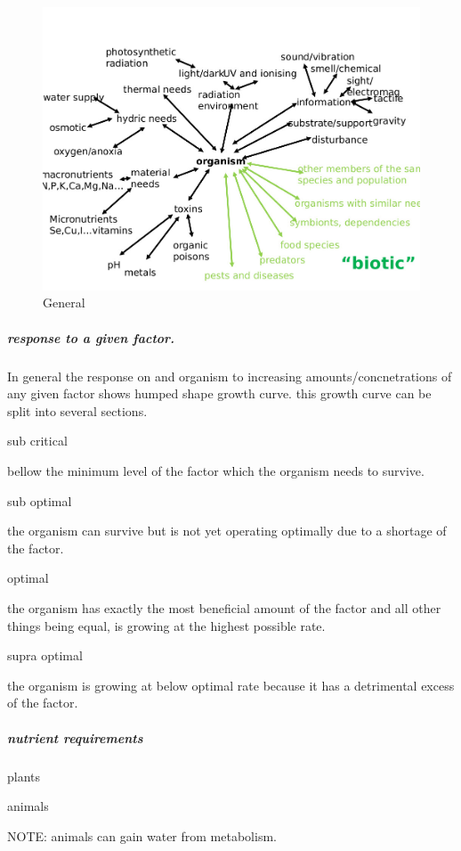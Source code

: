 \documentclass[]{article}
\let\oldsubparagraph\subparagraph
\renewcommand{\subparagraph}[1]{\oldsubparagraph{#1}\mbox{}}
\begin{document}
\begin{figure}
\centering
\includegraphics{Images/OrganismNeeds.jpg}
\caption{General}
\end{figure}

\hypertarget{response-to-a-given-factor.}{%
\subparagraph{response to a given
factor.}\label{response-to-a-given-factor.}}

In general the response on and organism to increasing
amounts/concnetrations of any given factor shows humped shape growth
curve. this growth curve can be split into several sections.

sub critical

bellow the minimum level of the factor which the organism needs to
survive.

sub optimal

the organism can survive but is not yet operating optimally due to a
shortage of the factor.

optimal

the organism has exactly the most beneficial amount of the factor and
all other things being equal, is growing at the highest possible rate.

supra optimal

the organism is growing at below optimal rate because it has a
detrimental excess of the factor.

\hypertarget{nutrient-requirements}{%
\subparagraph{nutrient requirements}\label{nutrient-requirements}}

plants

animals

NOTE: animals can gain water from metabolism.
\end{document}
